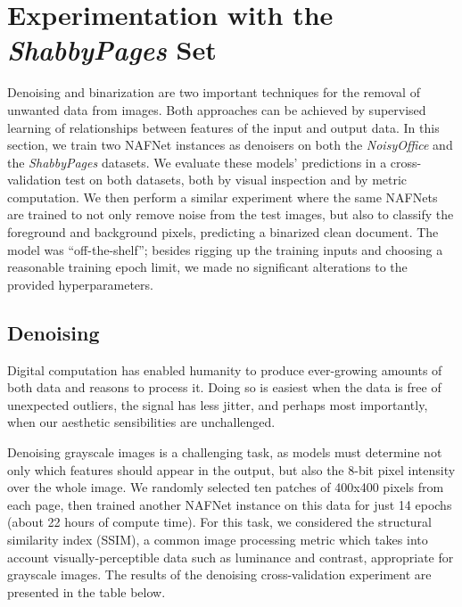 \documentclass[runningheads]{llncs}
\begin{document}
\section{Experimentation with the \emph{ShabbyPages} Set}
Denoising and binarization are two important techniques for the removal of unwanted data from images.
Both approaches can be achieved by supervised learning of relationships between features of the input and output data.
In this section, we train two NAFNet \cite{ref_nafnet} instances as denoisers on both the \mbox{\emph{NoisyOffice}} and the \mbox{\emph{ShabbyPages}} datasets. We evaluate these models' predictions in a cross-validation test on both datasets, both by visual inspection and by metric computation.
We then perform a similar experiment where the same NAFNets are trained to not only remove noise from the test images, but also to classify the foreground and background pixels, predicting a binarized clean document.
The model was ``off-the-shelf''; besides rigging up the training inputs and choosing a reasonable training epoch limit, we made no significant alterations to the provided hyperparameters.

\subsection{Denoising}
Digital computation has enabled humanity to produce ever-growing amounts of both data and reasons to process it.
Doing so is easiest when the data is free of unexpected outliers, the signal has less jitter, and perhaps most importantly, when our aesthetic sensibilities are unchallenged.

Denoising grayscale images is a challenging task, as models must determine not only which features should appear in the output, but also the 8-bit pixel intensity over the whole image.
We randomly selected ten patches of 400x400 pixels from each page, then trained another NAFNet instance on this data for just 14 epochs (about 22 hours of compute time).
For this task, we considered the structural similarity index (SSIM), a common image processing metric which takes into account visually-perceptible data such as luminance and contrast, appropriate for grayscale images.
The results of the denoising cross-validation experiment are presented in the table below.

\begin{table}[]
    \centering
    \caption{Document image denoising cross-test performance of NAFNet models trained on \emph{ShabbyPages} and \emph{NoisyOffice}.} \label{tab:denoising_results}
\end{table}
\end{document}
